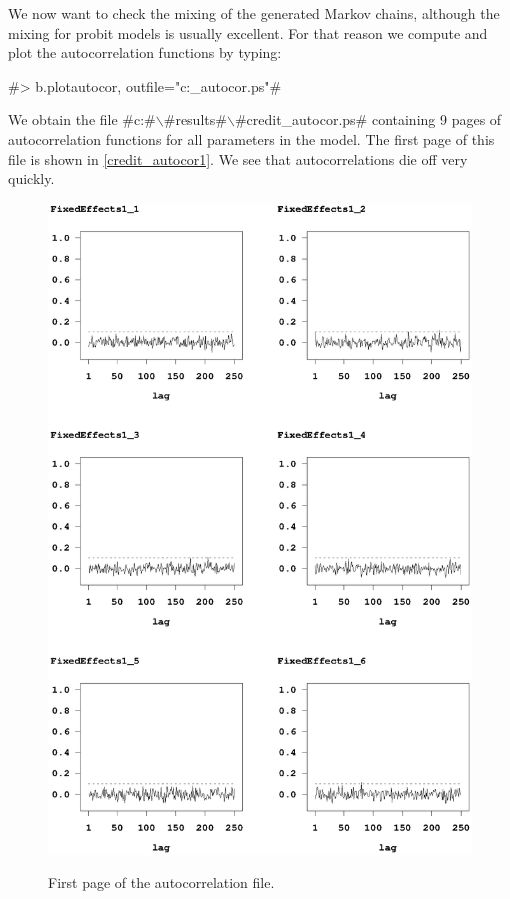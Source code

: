 We now want to check the mixing of the generated Markov chains,
although the mixing for probit models is usually excellent. For that
reason we compute and plot the autocorrelation functions by typing:

#> b.plotautocor, outfile="c:\results\credit_autocor.ps"#

We obtain the file
#c:#$\backslash$#results#$\backslash$#credit_autocor.ps# containing
9 pages of autocorrelation functions for all parameters in the
model. The first page of this file is shown in
\autoref{credit_autocor1}. We see that autocorrelations die off very
quickly.

\begin{figure}[ht]
\vspace{0.5cm}
\begin{center}
\includegraphics[scale=0.8]{grafiken/credit_autocor1.ps}
\end{center}
{\em\caption{ \label{credit_autocor1} First page of the
autocorrelation file.}}
\end{figure}

